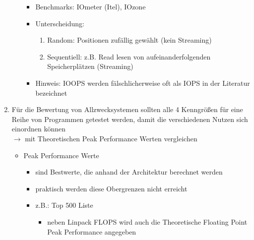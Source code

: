 \begin{enumerate}
\begin{itemize}
\begin{itemize}
\begin{itemize}
\begin{itemize}
				\end{itemize}
			\end{itemize}
			\item Benchmarks: IOmeter (Itel), IOzone
			\item Unterscheidung:
			\begin{enumerate}
				\item Random: Positionen zufällig gewählt (kein Streaming)
				\item Sequentiell: z.B. Read lesen von aufeinanderfolgenden Speicherplätzen (Streaming)
			\end{enumerate}
			\item Hinweis: IOOPS werden fälschlicherweise oft als IOPS in der Literatur bezeichnet
		\end{itemize}
	\end{itemize}
	\item Für die Bewertung von Allzwecksystemen sollten alle 4 Kenngrößen für eine Reihe von Programmen getestet werden, damit die verschiedenen Nutzen sich einordnen können\\
	\(\to\) mit Theoretischen Peak Performance Werten vergleichen
	\begin{itemize}
		\item Peak Performance Werte
		\begin{itemize}
			\item sind Bestwerte, die anhand der Architektur berechnet werden
			\item praktisch werden diese Obergrenzen nicht erreicht
			\item z.B.: Top 500 Liste
			\begin{itemize}
				\item neben Linpack FLOPS wird auch die Theoretische Floating Point Peak Performance angegeben
			\end{itemize}
		\end{itemize}
	\end{itemize}
\end{enumerate}
\section{}
